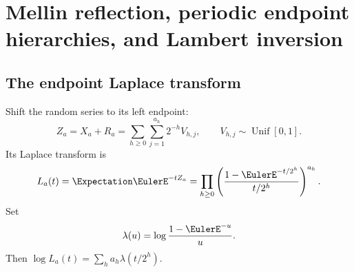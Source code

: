 \documentclass[11pt,oneside]{article}
\numberwithin{equation}{section}
\theoremstyle{definition}
\theoremstyle{remark}
\begin{document}
\section{Mellin reflection, periodic endpoint hierarchies, and Lambert inversion}
\label{p1:sec:mellin}

\subsection{The endpoint Laplace transform}

Shift the random series to its left endpoint:
\begin{equation}
 Z_a=X_a+R_a
 =\sum_{h\ge0}\sum_{j=1}^{a_h}2^{-h}V_{h,j},
 \qquad V_{h,j}\sim\operatorname{Unif}[0,1].
 \label{p1:eq:Za-positive}
\end{equation}
Its Laplace transform is
\begin{equation}
 L_a(t)=\Expectation\EulerE^{-tZ_a}
 =\prod_{h\ge0}
   \left(\frac{1-\EulerE^{-t/2^h}}{t/2^h}\right)^{a_h}.
 \label{p1:eq:La-product}
\end{equation}
Set
\begin{equation}
 \lambda(u)=\log\frac{1-\EulerE^{-u}}u.
 \label{p1:eq:lambda-kernel}
\end{equation}
Then $\log L_a(t)=\sum_ha_h\lambda(t/2^h)$.
\end{document}
